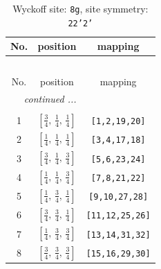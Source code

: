 \documentclass[fleqn,8pt]{jsarticle}
\begin{document}
\begin{longtable}{ccc}
\caption{Wyckoff site: {\tt 8g}, site symmetry: {\tt 22'2'}}
 \\
 \hline \hline
No. & position & mapping \\ \hline \endfirsthead

\multicolumn{2}{l}{\tablename\ \thetable{}} \\
 \hline \hline
No. & position & mapping \\ \hline \endhead

 \hline \hline
\multicolumn{2}{r}{\footnotesize\it continued ...} \\ \endfoot

 \hline \hline
\multicolumn{2}{r}{} \\ \endlastfoot

1 & $\left[ \frac{3}{4},\, \frac{1}{4},\, \frac{1}{4} \right]$ & {\tt [1,2,19,20]} \\ \hline
2 & $\left[ \frac{1}{4},\, \frac{1}{4},\, \frac{1}{4} \right]$ & {\tt [3,4,17,18]} \\ \hline
3 & $\left[ \frac{3}{4},\, \frac{1}{4},\, \frac{3}{4} \right]$ & {\tt [5,6,23,24]} \\ \hline
4 & $\left[ \frac{1}{4},\, \frac{1}{4},\, \frac{3}{4} \right]$ & {\tt [7,8,21,22]} \\ \hline
5 & $\left[ \frac{1}{4},\, \frac{3}{4},\, \frac{1}{4} \right]$ & {\tt [9,10,27,28]} \\ \hline
6 & $\left[ \frac{3}{4},\, \frac{3}{4},\, \frac{1}{4} \right]$ & {\tt [11,12,25,26]} \\ \hline
7 & $\left[ \frac{1}{4},\, \frac{3}{4},\, \frac{3}{4} \right]$ & {\tt [13,14,31,32]} \\ \hline
8 & $\left[ \frac{3}{4},\, \frac{3}{4},\, \frac{3}{4} \right]$ & {\tt [15,16,29,30]} \\
\end{longtable}
\renewcommand{\arraystretch}{1.2}
\end{document}
